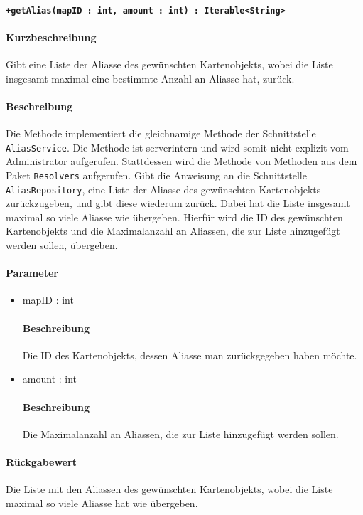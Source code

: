 \paragraph*{\texttt{+getAlias(mapID : int, amount : int) : Iterable<String>}}%
\paragraph*{Kurzbeschreibung}
Gibt eine Liste der Aliasse des gewünschten Kartenobjekts, wobei die Liste insgesamt maximal eine bestimmte Anzahl an Aliasse hat, zurück.
\paragraph*{Beschreibung}
Die Methode implementiert die gleichnamige Methode der Schnittstelle \texttt{AliasService}.
Die Methode ist serverintern und wird somit nicht explizit vom Administrator aufgerufen.
Stattdessen wird die Methode von Methoden aus dem Paket \texttt{Resolvers} aufgerufen.
Gibt die Anweisung an die Schnittstelle \texttt{AliasRepository}, eine Liste der Aliasse des gewünschten Kartenobjekts zurückzugeben, und gibt diese wiederum zurück.
Dabei hat die Liste insgesamt maximal so viele Aliasse wie übergeben.
Hierfür wird die ID des gewünschten Kartenobjekts und die Maximalanzahl an Aliassen, die zur Liste hinzugefügt werden sollen, übergeben.
\paragraph*{Parameter}
\begin{itemize}
    \item mapID : int
    		\paragraph*{Beschreibung}
    		Die ID des Kartenobjekts, dessen Aliasse man zurückgegeben haben möchte.
    	\item amount : int
    		\paragraph*{Beschreibung}
    		Die Maximalanzahl an Aliassen, die zur Liste hinzugefügt werden sollen.
\end{itemize}
\paragraph*{Rückgabewert}
Die Liste mit den Aliassen des gewünschten Kartenobjekts, wobei die Liste maximal so viele Aliasse hat wie übergeben.
